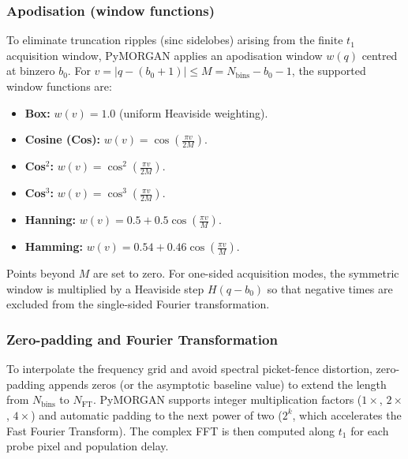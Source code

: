 \subsubsection{Apodisation (window functions)}
To eliminate truncation ripples (sinc sidelobes) arising from the finite $t_1$ acquisition window, PyMORGAN applies an apodisation window $w(q)$ centred at binzero $b_0$. For $v = |q - (b_0 + 1)| \le M = N_{\text{bins}} - b_0 - 1$, the supported window functions are:
\begin{itemize}
  \item \textbf{Box:} $w(v) = 1.0$ (uniform Heaviside weighting).
  \item \textbf{Cosine (Cos):} $w(v) = \cos\left(\frac{\pi v}{2 M}\right)$.
  \item \textbf{Cos$^2$:} $w(v) = \cos^2\left(\frac{\pi v}{2 M}\right)$.
  \item \textbf{Cos$^3$:} $w(v) = \cos^3\left(\frac{\pi v}{2 M}\right)$.
  \item \textbf{Hanning:} $w(v) = 0.5 + 0.5 \cos\left(\frac{\pi v}{M}\right)$.
  \item \textbf{Hamming:} $w(v) = 0.54 + 0.46 \cos\left(\frac{\pi v}{M}\right)$.
\end{itemize}
Points beyond $M$ are set to zero. For one-sided acquisition modes, the symmetric window is multiplied by a Heaviside step $H(q - b_0)$ so that negative times are excluded from the single-sided Fourier transformation.

\subsubsection{Zero-padding and Fourier Transformation}
To interpolate the frequency grid and avoid spectral picket-fence distortion, zero-padding appends zeros (or the asymptotic baseline value) to extend the length from $N_{\text{bins}}$ to $N_{\text{FT}}$. PyMORGAN supports integer multiplication factors ($1\times$, $2\times$, $4\times$) and automatic padding to the next power of two ($2^k$, which accelerates the Fast Fourier Transform). The complex FFT is then computed along $t_1$ for each probe pixel and population delay.

